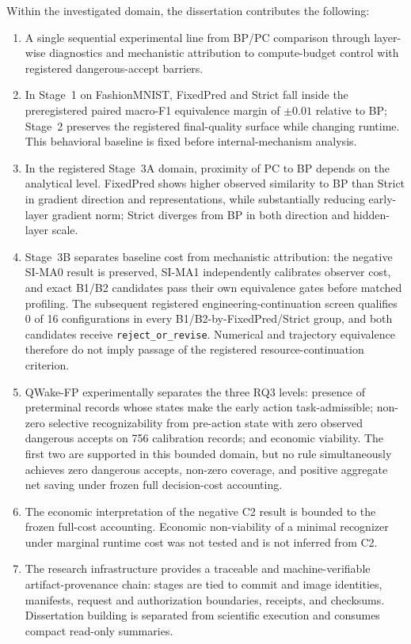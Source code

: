 Within the investigated domain, the dissertation contributes the following:
\begin{enumerate}
  \item A single sequential experimental line from BP/PC comparison through layer-wise diagnostics and mechanistic attribution to compute-budget control with registered dangerous-accept barriers.
  \item In Stage~1 on FashionMNIST, FixedPred and Strict fall inside the preregistered paired macro-F1 equivalence margin of \(\pm0.01\) relative to BP; Stage~2 preserves the registered final-quality surface while changing runtime. This behavioral baseline is fixed before internal-mechanism analysis.
  \item In the registered Stage~3A domain, proximity of PC to BP depends on the analytical level. FixedPred shows higher observed similarity to BP than Strict in gradient direction and representations, while substantially reducing early-layer gradient norm; Strict diverges from BP in both direction and hidden-layer scale.
  \item Stage~3B separates baseline cost from mechanistic attribution: the negative SI-MA0 result is preserved, SI-MA1 independently calibrates observer cost, and exact B1/B2 candidates pass their own equivalence gates before matched profiling. The subsequent registered engineering-continuation screen qualifies 0 of 16 configurations in every B1/B2-by-FixedPred/Strict group, and both candidates receive \texttt{reject\_or\_revise}. Numerical and trajectory equivalence therefore do not imply passage of the registered resource-continuation criterion.
  \item QWake-FP experimentally separates the three RQ3 levels: presence of preterminal records whose states make the early action task-admissible; non-zero selective recognizability from pre-action state with zero observed dangerous accepts on 756 calibration records; and economic viability. The first two are supported in this bounded domain, but no rule simultaneously achieves zero dangerous accepts, non-zero coverage, and positive aggregate net saving under frozen full decision-cost accounting.
  \item The economic interpretation of the negative C2 result is bounded to the frozen full-cost accounting. Economic non-viability of a minimal recognizer under marginal runtime cost was not tested and is not inferred from C2.
  \item The research infrastructure provides a traceable and machine-verifiable artifact-provenance chain: stages are tied to commit and image identities, manifests, request and authorization boundaries, receipts, and checksums. Dissertation building is separated from scientific execution and consumes compact read-only summaries.
\end{enumerate}

